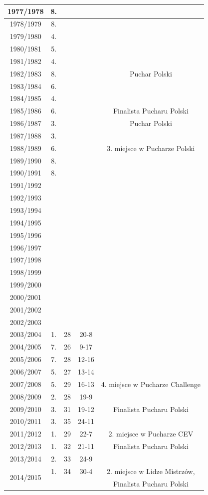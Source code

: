 \documentclass{article}
\begin{document}
\begin{tabular}{|c|c|c|c|c|}
1977/1978	&8.	 & & &\\		\hline
1978/1979	&8.	 & & &\\		\hline
1979/1980	&4.	 & & &\\	\hline	
1980/1981	&5.	 & & &\\	\hline	
1981/1982	&4.	 & & &\\	\hline	
1982/1983	&8.	&&&		Puchar Polski\\\hline
1983/1984	&6.	 & & &\\		\hline
1984/1985	&4.	 & & &\\		\hline
1985/1986	&6.	&	&	&Finalista Pucharu Polski\\\hline
1986/1987	&3.	&	&	&Puchar Polski\\\hline
1987/1988	&3.	&&&		\\\hline
1988/1989	&6.	&	&	&3. miejsce w Pucharze Polski\\\hline
1989/1990	&8.	 & & &\\		\hline
1990/1991	&8.	 & & &\\		\hline
1991/1992	& & & &\\		\hline
1992/1993	& & & &\\			\hline
1993/1994	& & & &\\			\hline
1994/1995	& & & &\\			\hline
1995/1996	& & & &\\			\hline
1996/1997	& & & &\\			\hline
1997/1998	& & & &\\			\hline
1998/1999	& & & &\\			\hline
1999/2000	& & & &\\			\hline
2000/2001	& & & &\\			\hline
2001/2002	& & & &\\			\hline
2002/2003		& & & &\\		\hline
2003/2004	&1.	&28	&20-8&	\\ \hline
2004/2005	&7.	&26	&9-17&	\\ \hline
2005/2006	&7.	&28	&12-16&	\\ \hline
2006/2007	&5.	&27	&13-14&	\\ \hline
2007/2008	&5.	&29	&16-13	&4. miejsce w Pucharze Challenge\\ \hline
2008/2009	&2.	&28	&19-9	&\\ \hline
2009/2010	&3.	&31	&19-12	&Finalista Pucharu Polski\\ \hline
2010/2011	&3.	&35	&24-11	&\\ \hline
2011/2012	&1.	&29	&22-7	&2. miejsce w Pucharze CEV\\ \hline
2012/2013	&1.	&32	&21-11	&Finalista Pucharu Polski\\ \hline
2013/2014	&2.	&33	&24-9	&\\ \hline
\multirow{2}{*}{2014/2015}	&1.	&34	&30-4	&2. miejsce w Lidze Mistrzów, \\
							&	&	&	&Finalista Pucharu Polski\\ 
\hline	
\end{tabular}	
\end{document}
